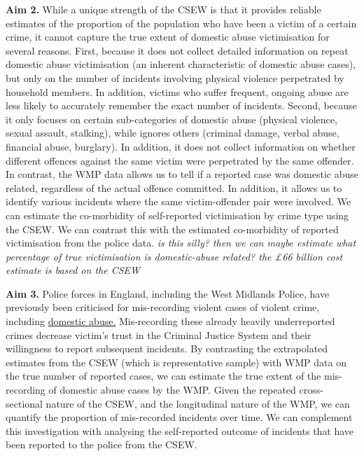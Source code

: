 \documentclass[11pt, a4paper]{article}
\begin{document}
\textbf{Aim 2.}  While a unique strength of the CSEW is that it provides reliable estimates of the proportion of the population who have been a victim of a certain crime, it cannot capture the true extent of domestic abuse victimisation for several reasons. First, because it does not collect detailed information on repeat domestic abuse victimisation (an inherent characteristic of domestic abuse cases), but only on the number of incidents involving physical violence perpetrated by household members. In addition, victims who suffer frequent, ongoing abuse are less likely to accurately remember the exact number of incidents. Second, because it only focuses on certain sub-categories of domestic abuse (physical violence, sexual assault, stalking), while ignores others (criminal damage, verbal abuse, financial abuse, burglary). In addition, it does not collect information on whether different offences against the same victim were perpetrated by the same offender. In contrast, the WMP data allows us to tell if a reported case was domestic abuse related, regardless of the actual offence committed. In addition, it allows us to identify various incidents where the same victim-offender pair were involved. We can estimate the co-morbidity of self-reported victimisation by crime type using the CSEW. We can contrast this with the estimated co-morbidity of reported victimisation from the police data. \textit{is this silly? then we can maybe estimate what percentage of true victimisation is domestic-abuse related? the £66 billion cost estimate is based on the CSEW}





\textbf{Aim 3.} Police forces in England, including the West Midlands Police, have previously been criticised for mis-recording violent cases of violent crime, including \href{https://www.bbc.co.uk/news/uk-england-468676578}{domestic abuse.} Mis-recording these already heavily underreported crimes decrease victim's trust in the Criminal Justice System and their willingness to report subsequent incidents. By contrasting the extrapolated estimates from the CSEW (which is representative sample) with WMP data on the true number of reported cases, we can estimate the true extent of the mis-recording of domestic abuse cases by the WMP. Given the repeated cross-sectional nature of the CSEW, and the longitudinal nature of the WMP, we can quantify the proportion of mis-recorded incidents over time. We can complement this investigation with analysing the self-reported outcome of incidents that have been reported to the police from the CSEW.
\end{document}
